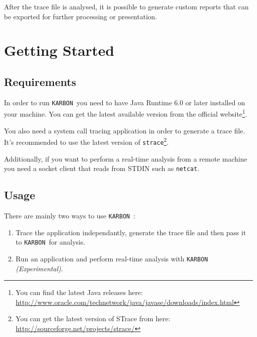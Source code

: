 \documentclass[12pt,a4paper]{scrreprt}
\newcommand{\karbon}{\texttt{KARBON {}}}
\begin{document}
After the trace file is analysed, it is possible to generate custom reports that can be exported for further processing or presentation.

\chapter{Getting Started}
\section{Requirements}
In order to run \karbon you need to have Java Runtime 6.0 or later installed on your machine. You can get the latest available version from the official website\footnote{You can find the latest Java releases here: \url{http://www.oracle.com/technetwork/java/javase/downloads/index.html}}.

You also need a system call tracing application in order to generate a trace file. It's recommended to use the latest version of {\tt strace}\footnote{You can get the latest version of STrace from here: \url{http://sourceforge.net/projects/strace/}}.

Additionally, if you want to perform a real-time analysis from a remote machine you need a socket client that reads from STDIN such as {\tt netcat}.

\section{Usage}
There are mainly two ways to use \karbon:
\begin{enumerate}
	\item Trace the application independantly, generate the trace file and then pass it to \karbon for analysis.
	\item Run an application and perform real-time analysis with \karbon \textit{(Experimental)}.
\end{enumerate}
\end{document}
